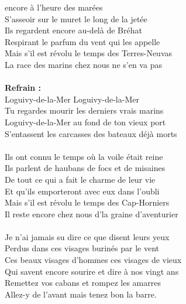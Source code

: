 
 encore à l'heure des marées
\\S'asseoir sur le muret le long de la jetée
\\Ils regardent encore au-delà de Bréhat
\\Respirant le parfum du vent qui les appelle
\\Mais s'il est révolu le temps des Terres-Neuvas
\\La race des marins chez nous ne s'en va pas
\\\\\textbf{Refrain :}
\\Loguivy-de-la-Mer Loguivy-de-la-Mer
\\Tu regardes mourir les derniers vrais marins
\\Loguivy-de-la-Mer au fond de ton vieux port
\\S'entassent les carcasses des bateaux déjà morts
\\\\Ils ont connu le temps où la voile était reine
\\Ils parlent de haubans de focs et de misaines
\\De tout ce qui a fait le charme de leur vie
\\Et qu'ils emporteront avec eux dans l'oubli
\\Mais s'il est révolu le temps des Cap-Horniers
\\Il reste encore chez nous d'la graine d'aventurier
\\\\Je n'ai jamais su dire ce que disent leurs yeux
\\Perdus dans ces visages burinés par le vent
\\Ces beaux visages d'hommes ces visages de vieux
\\Qui savent encore sourire et dire à nos vingt ans
\\Remettez vos cabans et rompez les amarres
\\Allez-y de l'avant mais tenez bon la barre.
\breakpage